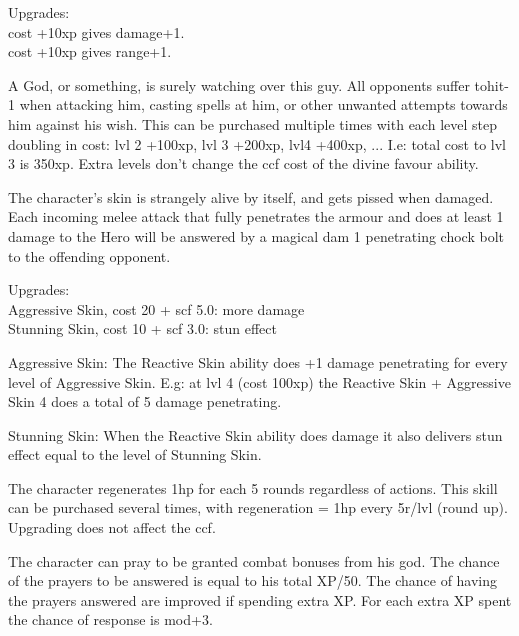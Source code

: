 Upgrades: \\
cost +10xp gives damage+1. \\
cost +10xp gives range+1.


 A God, or something, is surely watching over this guy. All opponents suffer tohit-1 when attacking him, casting spells at him, or other unwanted attempts towards him against his wish. This can be purchased multiple times with each level step doubling in cost: lvl 2 +100xp, lvl 3 +200xp, lvl4 +400xp, ... I.e: total cost to lvl 3 is 350xp. Extra levels don't change the ccf cost of the divine favour ability.


 The character's skin is strangely alive by itself, and gets pissed when damaged. Each incoming melee attack that fully penetrates the armour and does at least 1 damage to the Hero will be answered by a magical dam 1 penetrating chock bolt to the offending opponent.

Upgrades: \\
Aggressive Skin, cost 20 + scf 5.0: more damage\\
Stunning Skin, cost 10 + scf 3.0: stun effect

Aggressive Skin: The Reactive Skin ability does +1 damage penetrating for every level of Aggressive Skin. E.g: at lvl 4 (cost 100xp) the Reactive Skin + Aggressive Skin 4 does a total of 5 damage penetrating.

Stunning Skin: When the Reactive Skin ability does damage it also delivers stun effect equal to the level of Stunning Skin.


 The character regenerates 1hp for each 5 rounds regardless of actions. This skill can be purchased several times, with regeneration = 1hp every 5r/lvl (round up). Upgrading does not affect the ccf.


 The character can pray to be granted combat bonuses from his god. The chance of the prayers to be answered is equal to his total XP/50. The chance of having the prayers answered are improved if spending extra XP. For each extra XP spent the chance of response is mod+3.

